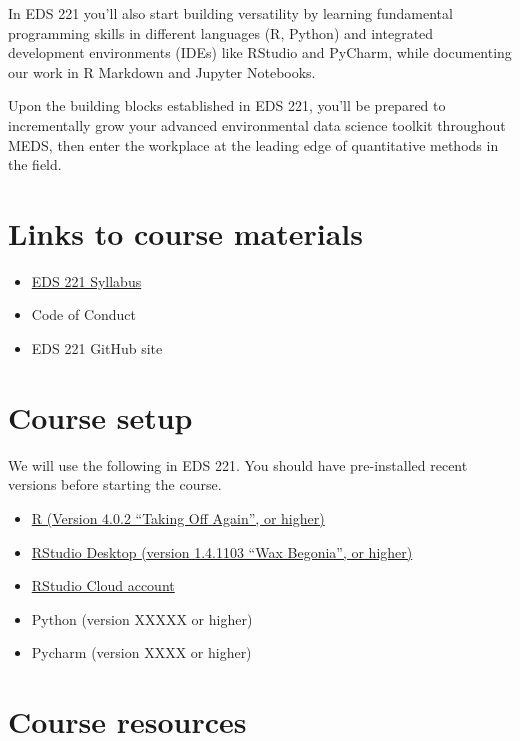 \documentclass[
]{book}
\providecommand{\tightlist}{%
  \setlength{\itemsep}{0pt}\setlength{\parskip}{0pt}}
\begin{document}
In EDS 221 you'll also start building versatility by learning fundamental programming skills in different languages (R, Python) and integrated development environments (IDEs) like RStudio and PyCharm, while documenting our work in R Markdown and Jupyter Notebooks.

Upon the building blocks established in EDS 221, you'll be prepared to incrementally grow your advanced environmental data science toolkit throughout MEDS, then enter the workplace at the leading edge of quantitative methods in the field.

\hypertarget{links-to-course-materials}{%
\section{Links to course materials}\label{links-to-course-materials}}

\begin{itemize}
\tightlist
\item
  \href{https://docs.google.com/document/d/1OGbc6U3STKdsThUKd9Nj5UgzeB7djgM130ku1UUH1gU/edit?usp=sharing}{EDS 221 Syllabus}
\item
  Code of Conduct
\item
  EDS 221 GitHub site
\end{itemize}

\hypertarget{course-setup}{%
\section{Course setup}\label{course-setup}}

We will use the following in EDS 221. You should have pre-installed recent versions before starting the course.

\begin{itemize}
\tightlist
\item
  \href{https://www.r-project.org/}{R (Version 4.0.2 ``Taking Off Again'', or higher)}
\item
  \href{https://rstudio.com/products/rstudio/}{RStudio Desktop (version 1.4.1103 ``Wax Begonia'', or higher)}
\item
  \href{https://rstudio.cloud/}{RStudio Cloud account}
\item
  Python (version XXXXX or higher)
\item
  Pycharm (version XXXX or higher)
\end{itemize}

\hypertarget{course-resources}{%
\section{Course resources}\label{course-resources}}
\end{document}
